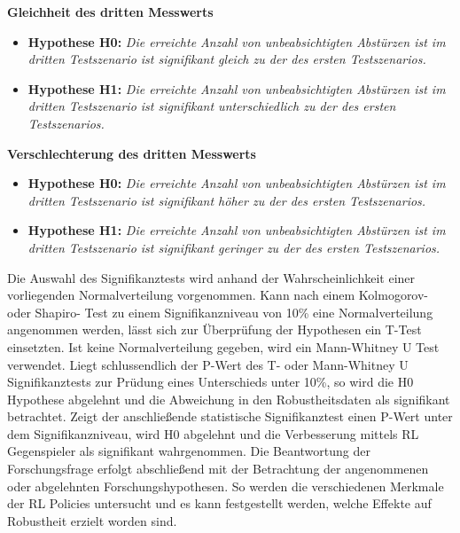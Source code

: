 \textbf{Gleichheit des dritten Messwerts}
\begin{itemize}
    \item \textbf{Hypothese H0:} \textit{Die erreichte Anzahl von unbeabsichtigten Abstürzen ist im dritten Testszenario ist signifikant gleich zu der des ersten Testszenarios.}
    \item \textbf{Hypothese H1:} \textit{Die erreichte Anzahl von unbeabsichtigten Abstürzen ist im dritten Testszenario ist signifikant unterschiedlich zu der des ersten Testszenarios.}
\end{itemize}

\textbf{Verschlechterung des dritten Messwerts}
\begin{itemize}
    \item \textbf{Hypothese H0:} \textit{Die erreichte Anzahl von unbeabsichtigten Abstürzen ist im dritten Testszenario ist signifikant höher zu der des ersten Testszenarios.}
    \item \textbf{Hypothese H1:} \textit{Die erreichte Anzahl von unbeabsichtigten Abstürzen ist im dritten Testszenario ist signifikant geringer zu der des ersten Testszenarios.}
\end{itemize}

Die Auswahl des Signifikanztests wird anhand der Wahrscheinlichkeit einer vorliegenden Normalverteilung vorgenommen.
Kann nach einem Kolmogorov- oder Shapiro- Test zu einem Signifikanzniveau von 10\% eine Normalverteilung angenommen werden, lässt sich zur Überprüfung der Hypothesen ein T-Test einsetzten.
Ist keine Normalverteilung gegeben, wird ein Mann-Whitney U Test verwendet.
Liegt schlussendlich der P-Wert des T- oder Mann-Whitney U Signifikanztests zur Prüdung eines Unterschieds unter 10\%, so wird die H0 Hypothese abgelehnt und die Abweichung in den Robustheitsdaten als signifikant betrachtet.
Zeigt der anschließende statistische Signifikanztest einen P-Wert unter dem Signifikanzniveau, wird H0 abgelehnt und die Verbesserung mittels RL Gegenspieler als signifikant wahrgenommen.
Die Beantwortung der Forschungsfrage erfolgt abschließend mit der Betrachtung der angenommenen oder abgelehnten Forschungshypothesen.
So werden die verschiedenen Merkmale der RL Policies untersucht und es kann festgestellt werden, welche Effekte auf Robustheit erzielt worden sind.
